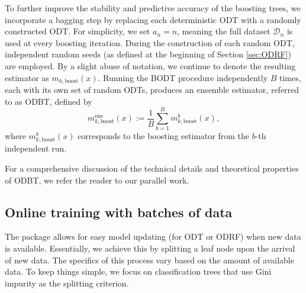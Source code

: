 To further improve the stability and predictive accuracy of the boosting trees, we incorporate a bagging step by replacing each deterministic ODT with a randomly constructed ODT. For simplicity, we set \(a_n = n\), meaning the full dataset \(\mathcal{D}_n\) is used at every boosting iteration.
During the construction of each random ODT, independent random seeds (as defined at the beginning of Section \ref{sec:ODRF}) are employed. By a slight abuse of notation, we continue to denote the resulting estimator as \(m_{k,\text{boost}}(x)\).
Running the BODT procedure independently \(B\) times, each with its own set of random ODTs, produces an ensemble estimator, referred to as ODBT, defined by
\[
m_{k,\text{boost}}^{\text{ens}}(x) := \frac{1}{B} \sum_{b=1}^B m_{k,\text{boost}}^{b}(x),
\]
where \(m_{k,\text{boost}}^{b}(x)\) corresponds to the boosting estimator from the \(b\)-th independent run.

For a comprehensive discussion of the technical details and theoretical properties of ODBT, we refer the reader to our parallel work.%

\subsection{Online training with batches of data}
\label{sec:online}

The package allows for easy model updating (for ODT or ODRF) when new data is available. Essentially, we achieve this by splitting a leaf node upon the arrival of new data. The specifics of this process vary based on the amount of available data. To keep things simple, we focus  on classification trees that use Gini impurity as the splitting criterion.

